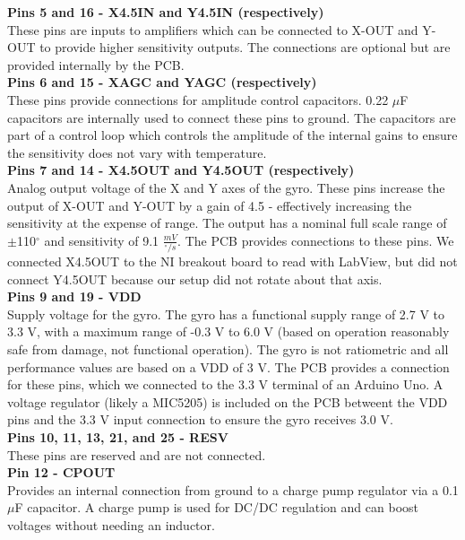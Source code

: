 \documentclass{article}
\theoremstyle{plain}
\theoremstyle{definition}
\theoremstyle{remark}
\begin{document}
\textbf{Pins 5 and 16 - X4.5IN and Y4.5IN (respectively)}\\
These pins are inputs to amplifiers which can be connected to X-OUT and Y-OUT to provide higher sensitivity outputs. The connections are optional but are provided internally by the PCB.\\

\textbf{Pins 6 and 15 - XAGC and YAGC (respectively)}\\
These pins provide connections for amplitude control capacitors. 0.22 $\mu$F capacitors are internally used to connect these pins to ground. The capacitors are part of a control loop which controls the amplitude of the internal gains to ensure the sensitivity does not vary with temperature.\\

\textbf{Pins 7 and 14 - X4.5OUT and Y4.5OUT (respectively)}\\
Analog output voltage of the X and Y axes of the gyro. These pins increase the output of X-OUT and Y-OUT by a gain of 4.5 - effectively increasing the sensitivity at the expense of range. The output has a nominal full scale range of $\pm$110$^{\circ}$ and sensitivity of 9.1 $\frac{mV}{^{\circ}/s}$. The PCB provides connections to these pins. We connected X4.5OUT to the NI breakout board to read with LabView, but did not connect Y4.5OUT because our setup did not rotate about that axis.\\

\textbf{Pins 9 and 19 - VDD}\\
Supply voltage for the gyro. The gyro has a functional supply range of 2.7 V to 3.3 V, with a maximum range of -0.3 V to 6.0 V (based on operation reasonably safe from damage, not functional operation). The gyro is not ratiometric and all performance values are based on a VDD of 3 V. The PCB provides a connection for these pins, which we connected to the 3.3 V terminal of an Arduino Uno. A voltage regulator (likely a MIC5205) is included on the PCB betweent the VDD pins and the 3.3 V input connection to ensure the gyro receives 3.0 V. \\ 

\textbf{Pins 10, 11, 13, 21, and 25 - RESV}\\
These pins are reserved and are not connected.\\

\textbf{Pin 12 - CPOUT}\\
Provides an internal connection from ground to a charge pump regulator via a 0.1 $\mu$F capacitor. A charge pump is used for DC/DC regulation and can boost voltages without needing an inductor.\\
\end{document}
